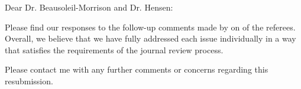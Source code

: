 \opening{Dear Dr. Beausoleil-Morrison and Dr. Hensen:}


\begin{newlfm}
Please find our responses to the follow-up comments made by on of the referees. Overall, we believe that we have fully addressed each issue individually in a way that satisfies the requirements of the journal review process. 

Please contact me with any further comments or concerns regarding this resubmission.

\end{newlfm}
